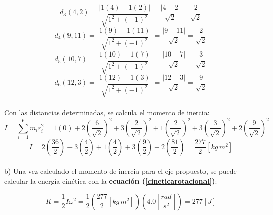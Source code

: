 \documentclass[letter,twoside,11pt]{article}
\begin{document}
\begin{minipage}[b]{.9\linewidth}
\begin{equation*}
    d_3(4,2) = \frac{| 1 (4) - 1 (2) |}{\sqrt{1^2 + (-1)^2}} = \frac{|4 - 2|}{\sqrt{2}} = \frac{2}{\sqrt{2}}
\end{equation*}
\begin{equation*}
    d_4(9,11) = \frac{| 1 (9) - 1 (11) |}{\sqrt{1^2 + (-1)^2}} = \frac{|9 - 11|}{\sqrt{2}} = \frac{2}{\sqrt{2}}
\end{equation*}
\begin{equation*}
    d_5(10,7) = \frac{| 1 (10) - 1 (7) |}{\sqrt{1^2 + (-1)^2}} = \frac{|10 - 7|}{\sqrt{2}} = \frac{3}{\sqrt{2}}
\end{equation*}
\begin{equation*}
    d_6(12,3) = \frac{| 1 (12) - 1 (3) |}{\sqrt{1^2 + (-1)^2}} = \frac{|12 - 3|}{\sqrt{2}} = \frac{9}{\sqrt{2}}
\end{equation*}
\\

Con las distancias determinadas, se calcula el momento de inercia:
\begin{equation*}
    I = \sum_{i=1}^{6} m_i r^2_i = 1 (0) + 2\left(\frac{6}{\sqrt{2}}\right)^2 + 3\left(\frac{2}{\sqrt{2}}\right)^2 + 1\left(\frac{2}{\sqrt{2}}\right)^2 + 3\left(\frac{3}{\sqrt{2}}\right)^2 + 2\left(\frac{9}{\sqrt{2}}\right)^2
\end{equation*}
\begin{equation*}
    I = 2 \left(\frac{36}{2}\right) + 3 \left(\frac{4}{2}\right) + 1 \left(\frac{4}{2}\right) + 3 \left(\frac{9}{2}\right) + 2 \left(\frac{81}{2}\right) = \frac{277}{2} [kg\, m^2]
\end{equation*}
\\

b) Una vez calculado el momento de inercia para el eje propuesto, se puede
calcular la energía cinética con la \textbf{ecuación
(\ref{cineticarotacional})}:

\begin{equation*}
    K = \frac{1}{2} I \omega^2 =  \frac{1}{2} \left(\frac{277}{2} [kg\, m^2]\right) \left(4.0 \left[\frac{rad}{s^2}\right]\right) = 277 [J]
\end{equation*}
\end{minipage}
\end{document}
